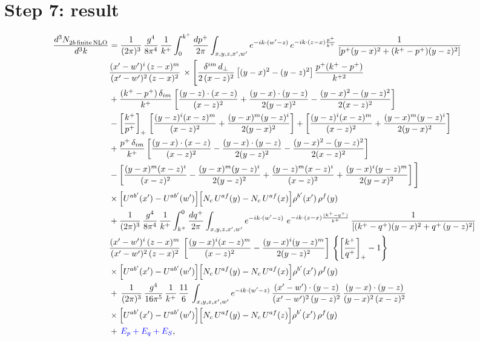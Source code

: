 \documentclass[10pt]{article}
\numberwithin{equation}{section}
\begin{document}
\section{Step 7: result}
\begin{align}
    \frac{d^{3}N_{2b\,\rm finite\, NLO}^{\rm}}{d^{3}k} & = \frac{1}{(2\pi)^{3}}\,\frac{g^{4}}{8\pi^{4}}\,\frac{1}{k^{+}}\int_{0}^{k^{+}}\frac{dp^{+}}{2\pi}\int_{x,y,z,x',w'}e^{-ik\cdot(w'-z)}\,e^{-ik\cdot(z-x)\frac{p^{+}}{k^{+}}}\,\frac{1}{\left[p^{+}(y-x)^{2}+(k^{+}-p^{+})(y-z)^{2}\right]}\notag \\ & \frac{(x'-w')^{i}\,(z-x)^{m}}{(x'-w')^{2}\,(z-x)^{2}}\,\times\Bigg[\frac{\delta^{im}\,d_{\perp}}{2\,(x-z)^{2}}\left[(y-x)^{2}-(y-z)^{2}\right]\frac{p^{+}(k^{+}-p^{+})}{k^{+2}}
\notag \\ & +\frac{(k^{+}-p^{+})\,\delta_{im}}{k^{+}}\left[\frac{(y-z)\cdot(x-z)}{(x-z)^{2}}+\frac{(y-x)\cdot(y-z)}{2(y-x)^{2}}-\frac{(y-x)^{2}-(y-z)^{2}}{2(x-z)^{2}}\right]\notag\\
&-\left[\frac{k^{+}}{p^{+}}\right]_{+}\,\left[\frac{(y-z)^{i}(x-z)^{m}}{(x-z)^{2}}+\frac{(y-x)^{m}(y-z)^{i}}{2(y-x)^{2}}\right]+\left[\frac{(y-z)^{i}(x-z)^{m}}{(x-z)^{2}}+\frac{(y-x)^{m}(y-z)^{i}}{2(y-x)^{2}}\right]\notag\\
&+\frac{p^{+}\,\delta_{im}}{k^{+}}\left[\frac{(y-x)\cdot(x-z)}{(x-z)^{2}}-\frac{(y-x)\cdot(y-z)}{2(y-z)^{2}}-\frac{(y-x)^{2}-(y-z)^{2}}{2(x-z)^{2}}\right]\notag\\
&-\left[\frac{(y-x)^{m}(x-z)^{i}}{(x-z)^{2}}-\frac{(y-x)^{m}(y-z)^{i}}{2(y-z)^{2}}+\frac{(y-z)^{m}(x-z)^{i}}{(x-z)^{2}}+\frac{(y-x)^{i}(y-z)^{m}}{2(y-x)^{2}}\right]\Bigg]\notag\\
&\times\Big[U^{ab'}(x')-U^{ab'}(w')\Big]\Big[N_{c}\,U^{af}(y)-N_{c}\,U^{af}(x)\Big]\rho^{b'}(x')\,\rho^{f}(y)\notag \\ & + \frac{1}{(2\pi)^{3}}\,\frac{g^{4}}{8\pi^{4}}\,\frac{1}{k^{+}}\int_{k^{+}}^{0}\frac{dq^{+}}{2\pi}\int_{x,y,z,x',w'}e^{-ik\cdot(w'-z)}\ e^{-ik\cdot(z-x)\frac{(k^{+}-q^{+})}{k^{+}}}\,\frac{1}{\left[(k^{+}-q^{+})(y-x)^{2}+q^{+}\,(y-z)^{2}\right]}\notag \\ & \frac{(x'-w')^{i}\,(z-x)^{m}}{(x'-w')^{2}\,(z-x)^{2}}\,\left[\frac{(y-x)^{i}(x-z)^{m}}{(x-z)^{2}}-\frac{(y-x)^{i}(y-z)^{m}}{2(y-z)^{2}}\right]\,\left\{\left[\frac{k^{+}}{q^{+}}\right]_{+}-1\right\}\notag \\ & \times\Big[U^{ab'}(x')-U^{ab'}(w')\Big]\Big[N_{c}\,U^{af}(y)-N_{c}\,U^{af}(x)\Big]\rho^{b'}(x')\,\rho^{f}(y)\notag \\ & +\, \frac{1}{(2\pi)^{3}}\,\frac{g^{4}}{16\pi^{5}}\,\frac{1}{k^{+}}\,\frac{11}{6}\,\int_{x,y,z,x',w'}e^{-ik\cdot(w'-z)}\, \frac{(x'-w')\cdot(y-z)}{(x'-w')^{2}\,(y-z)^{2}}\,\frac{(y-x)\cdot(y-z)}{(y-x)^{2}\,(x-z)^{2}}\notag \\ & \times\Big[U^{ab'}(x')-U^{ab'}(w')\Big]\Big[N_{c}\,U^{af}(y)-N_{c}\,U^{af}(z)\Big]\rho^{b'}(x')\,\rho^{f}(y)\notag\\
&+\,{\color{blue}E_{p}+E_{q}+E_{S}},
\label{eq:result}
\end{align}
\end{document}
